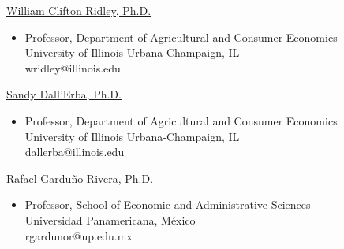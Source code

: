 \documentclass[11pt]{article}
\newenvironment{innerlist}[1][\enskip\textbullet]%
        {\begin{itemize}[#1,leftmargin=*,parsep=0pt,itemsep=0pt,topsep=0pt,partopsep=0pt]}
        {\end{itemize}}
\newcommand{\halfblankline}{\quad\vspace{-0.5\baselineskip}\pagebreak[3]}
\begin{document}
\href{https://ace.illinois.edu/directory/wridley}
{William Clifton Ridley, Ph.D.}
\begin{innerlist}
    \item[] Professor, Department of Agricultural and Consumer Economics \\
            University of Illinois Urbana-Champaign, IL \\
	        wridley@illinois.edu
\end{innerlist}
\halfblankline

\href{https://ace.illinois.edu/directory/dallerba}
{Sandy Dall'Erba, Ph.D.}
\begin{innerlist}
	\item[] Professor, Department of Agricultural and Consumer Economics \\
	University of Illinois Urbana-Champaign, IL \\
	dallerba@illinois.edu
\end{innerlist}
\halfblankline

\href{https://scholar.google.com/citations?user=Ju4Y-EwAAAAJ&hl=en}
{Rafael Garduño-Rivera, Ph.D.}
\begin{innerlist}
	\item[] Professor, School of Economic and Administrative Sciences \\
	Universidad Panamericana, México \\
	rgardunor@up.edu.mx
\end{innerlist}
\halfblankline


\end{document}

